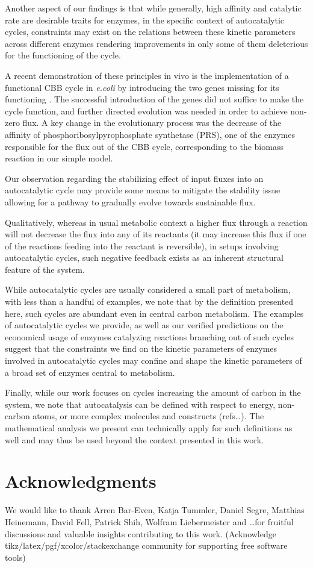 \documentclass[a4page,notitlepage]{article}
\begin{document}
Another aspect of our findings is that while generally, high affinity and catalytic rate are desirable traits for enzymes, in the specific context of autocatalytic cycles, constraints may exist on the relations between these kinetic parameters across different enzymes rendering improvements in only some of them deleterious for the functioning of the cycle.

A recent demonstration of these principles in vivo is the implementation of a functional CBB cycle in \emph{e.coli} by introducing the two genes missing for its functioning \cite{Antonovski2016}.
The successful introduction of the genes did not suffice to make the cycle function, and further directed evolution was needed in order to achieve non-zero flux.
A key change in the evolutionary process was the decrease of the affinity of phosphoribosylpyrophosphate synthetase (PRS), one of the enzymes responsible for the flux out of the CBB cycle, corresponding to the biomass reaction in our simple model.

Our observation regarding the stabilizing effect of input fluxes into an autocatalytic cycle may provide some means to mitigate the stability issue allowing for a pathway to gradually evolve towards sustainable flux.

Qualitatively, whereas in usual metabolic context a higher flux through a reaction will not decrease the flux into any of its reactants (it may increase this flux if one of the reactions feeding into the reactant is reversible), in setups involving autocatalytic cycles, such negative feedback exists as an inherent structural feature of the system.

While autocatalytic cycles are usually considered a small part of metabolism, with less than a handful of examples, we note that by the definition presented here, such cycles are abundant even in central carbon metabolism.
The examples of autocatalytic cycles we provide, as well as our verified predictions on the economical usage of enzymes catalyzing reactions branching out of such cycles suggest that the constraints we find on the kinetic parameters of enzymes involved in autocatalytic cycles may confine and shape the kinetic parameters of a broad set of enzymes central to metabolism.

  Finally, while our work focuses on cycles increasing the amount of carbon in the system, we note that autocatalysis can be defined with respect to energy, non-carbon atoms, or more complex molecules and constructs (refs\dots).
  The mathematical analysis we present can technically apply for such definitions as well and may thus be used beyond the context presented in this work.
\section{Acknowledgments}
We would like to thank Arren Bar-Even, Katja Tummler, Daniel Segre, Matthias Heinemann, David Fell, Patrick Shih, Wolfram Liebermeister  and \dots for fruitful discussions and valuable insights contributing to this work.
(Acknowledge tikz/latex/pgf/xcolor/stackexchange community for supporting free software tools)
{}

\end{document}
